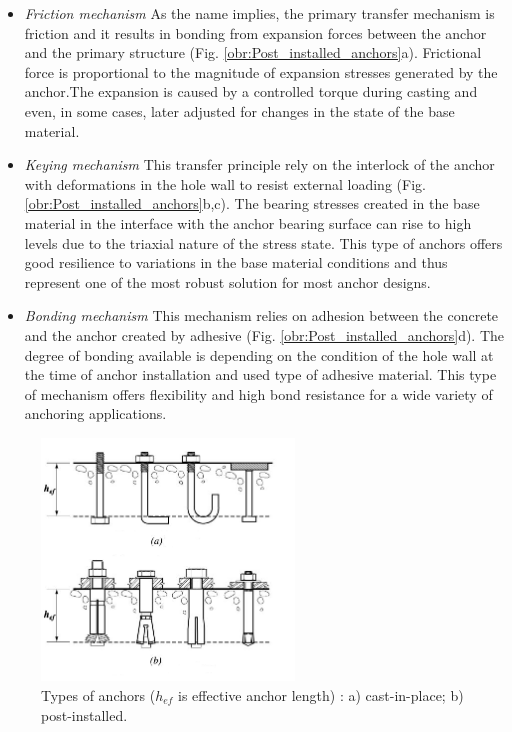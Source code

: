 \begin{itemize}
	\item \textit{Friction mechanism}
	As the name implies, the primary transfer mechanism is friction and it results in bonding from expansion forces between the anchor and the primary structure (Fig. \ref{obr:Post_installed_anchors}a). Frictional force is proportional to the magnitude of expansion stresses generated by the anchor.The expansion is caused by a controlled torque during casting and even, in some cases, later adjusted for changes in the state of the base material.
	
	\item \textit{Keying mechanism}
	This transfer principle rely on the interlock of the anchor with deformations in the hole wall to resist external loading (Fig. \ref{obr:Post_installed_anchors}b,c). The bearing stresses created in the base material in the interface with the anchor bearing surface can rise to high levels due to the triaxial nature of the stress state. This type of anchors offers good resilience to variations in the base material conditions and thus represent one of the most robust solution for most anchor designs. 
	
	\item \textit{Bonding mechanism}
	This mechanism relies on adhesion between the concrete and the anchor created by adhesive (Fig. \ref{obr:Post_installed_anchors}d). The degree of bonding available is depending on the condition of the hole wall at the time of anchor installation and used type of adhesive material. This type of mechanism offers flexibility and high bond resistance for a wide variety of anchoring applications. 
\end{itemize}

\begin{figure}[h!] 
	\centering 
	\includegraphics[width=0.6\textwidth]{obrazky/anchor_types_repaired.png} 
	\caption[Types of anchors]{Types of anchors ($h_{ef}$ is effective anchor length) \cite{anchors-ACI-318M}: a) cast-in-place; b) post-installed.}\label{obr:Anchors} 
\end{figure} 



